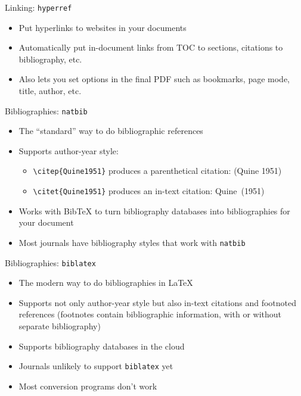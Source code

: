 \begin{frame}{Linking: \texttt{hyperref}}

\begin{itemize}
\item Put hyperlinks to websites in your documents
\item Automatically put in-document links from TOC to sections,
  citations to bibliography, etc.
\item Also lets you set options in the final PDF such as bookmarks,
  page mode, title, author, etc.
\end{itemize}

\end{frame}

\begin{frame}[fragile]{Bibliographies: \texttt{natbib}}

\begin{itemize}
\item The ``standard'' way to do bibliographic references
\item Supports author-year style:
\begin{itemize}
\item \verb+\citep{Quine1951}+ produces a parenthetical citation: (Quine 1951)
\item \verb+\citet{Quine1951}+ produces an in-text citation: Quine~(1951)
\end{itemize}
\item Works with Bib\TeX{} to turn bibliography databases into
  bibliographies for your document
\item Most journals have bibliography styles that work with \texttt{natbib} 
\end{itemize}

\end{frame}

\begin{frame}{Bibliographies: \texttt{biblatex}}

\begin{itemize}
\item The modern way to do bibliographies in \LaTeX
\item Supports not only author-year style but also in-text citations
  and footnoted references (footnotes contain bibliographic
  information, with or without separate bibliography)
\item Supports bibliography databases in the cloud
\item Journals unlikely to support \texttt{biblatex} yet
\item Most conversion programs don't work 
\end{itemize}

\end{frame}

